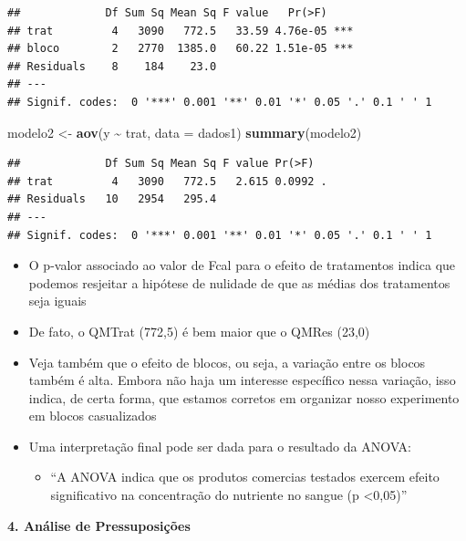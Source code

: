 \documentclass[
]{book}
\newenvironment{Shaded}{\begin{snugshade}}{\end{snugshade}}
\newcommand{\AttributeTok}[1]{\textcolor[rgb]{0.13,0.29,0.53}{#1}}
\newcommand{\FunctionTok}[1]{\textcolor[rgb]{0.13,0.29,0.53}{\textbf{#1}}}
\newcommand{\NormalTok}[1]{#1}
\newcommand{\OtherTok}[1]{\textcolor[rgb]{0.56,0.35,0.01}{#1}}
\newcommand{\SpecialCharTok}[1]{\textcolor[rgb]{0.81,0.36,0.00}{\textbf{#1}}}
\providecommand{\tightlist}{%
  \setlength{\itemsep}{0pt}\setlength{\parskip}{0pt}}
\begin{document}
\begin{verbatim}
##             Df Sum Sq Mean Sq F value   Pr(>F)    
## trat         4   3090   772.5   33.59 4.76e-05 ***
## bloco        2   2770  1385.0   60.22 1.51e-05 ***
## Residuals    8    184    23.0                     
## ---
## Signif. codes:  0 '***' 0.001 '**' 0.01 '*' 0.05 '.' 0.1 ' ' 1
\end{verbatim}

\begin{Shaded}
\begin{Highlighting}[]
\NormalTok{modelo2 }\OtherTok{\textless{}{-}} \FunctionTok{aov}\NormalTok{(y }\SpecialCharTok{\textasciitilde{}}\NormalTok{ trat, }\AttributeTok{data =}\NormalTok{ dados1)}
\FunctionTok{summary}\NormalTok{(modelo2)}
\end{Highlighting}
\end{Shaded}

\begin{verbatim}
##             Df Sum Sq Mean Sq F value Pr(>F)  
## trat         4   3090   772.5   2.615 0.0992 .
## Residuals   10   2954   295.4                 
## ---
## Signif. codes:  0 '***' 0.001 '**' 0.01 '*' 0.05 '.' 0.1 ' ' 1
\end{verbatim}

\begin{itemize}
\tightlist
\item
  O p-valor associado ao valor de Fcal para o efeito de tratamentos indica que podemos resjeitar a hipótese de nulidade de que as médias dos tratamentos seja iguais
\item
  De fato, o QMTrat (772,5) é bem maior que o QMRes (23,0)
\item
  Veja também que o efeito de blocos, ou seja, a variação entre os blocos também é alta. Embora não haja um interesse específico nessa variação, isso indica, de certa forma, que estamos corretos em organizar nosso experimento em blocos casualizados
\item
  Uma interpretação final pode ser dada para o resultado da ANOVA:

  \begin{itemize}
  \tightlist
  \item
    ``A ANOVA indica que os produtos comercias testados exercem efeito significativo na concentração do nutriente no sangue (p \textless0,05)''
  \end{itemize}
\end{itemize}

\textbf{4. Análise de Pressuposições}
\end{document}
